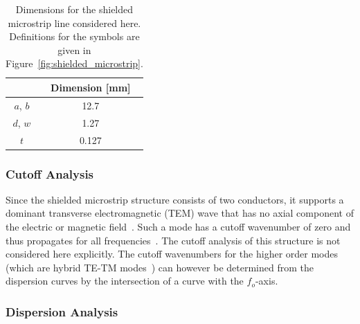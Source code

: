 \begin{table}[b]
 \centering
 \caption{Dimensions for the shielded microstrip line considered here. Definitions for the symbols are given in Figure~\ref{fig:shielded_microstrip}.}
 \label{tab:shielded_microstrip_dimensions}
 \begin{tabular}{|c|c|}
  \hline
   & Dimension [mm]\\
  \hline
   $a$, $b$ & 12.7\\
   $d$, $w$ & 1.27\\
   $t$ & 0.127\\
  \hline
 \end{tabular}
\end{table}

\subsubsection{Cutoff Analysis}

Since the shielded microstrip structure consists of two conductors, it
supports a dominant transverse electromagnetic (TEM) wave that has no
axial component of the electric or magnetic field~\cite{Poz2005}. Such
a mode has a cutoff wavenumber of zero and
thus propagates for all frequencies~\cite{Jin2002,PelCoc1998}. The
cutoff analysis of this structure is not considered here
explicitly. The cutoff wavenumbers for the higher order modes (which
are hybrid TE-TM modes~\cite{Poz2005}) can however be determined from
the dispersion curves by the intersection of a curve with the
$f_o$-axis.

\subsubsection{Dispersion Analysis}

